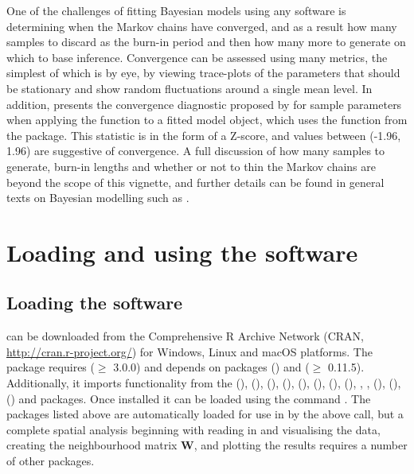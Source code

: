 \documentclass[article, nojss]{jss}
\begin{document}
\hspace{1cm} One of the challenges of fitting Bayesian models using any software is determining when the Markov chains have converged, and as a result how many samples to discard as the burn-in period and then how many more to generate on which to base inference. Convergence can be assessed using many metrics, the simplest of which is by eye, by viewing trace-plots of the parameters that should be stationary and show random fluctuations around a single mean level. In addition,  presents the convergence  diagnostic proposed by \cite{geweke1992} for sample parameters when applying the  function to a fitted model object, which uses the  function from the  package. This statistic is in the form of a Z-score, and values between (-1.96, 1.96) are suggestive of convergence. A full discussion of how many samples to generate, burn-in lengths and whether or not to thin the Markov chains are beyond the scope of this vignette, and further details can be found in general texts on Bayesian modelling such as \cite{gelman2013}.


\section{Loading and using the software}\label{section3}

\subsection{Loading the software}
 can be downloaded from the Comprehensive R Archive Network (CRAN, \url{http://cran.r-project.org/}) for Windows, Linux and macOS platforms.  The package requires  ($\geq$ 3.0.0) and depends on packages  (\citealp{mass2002}) and  ($\geq$ 0.11.5). Additionally, it imports functionality from the  (\citealp{carbayesdata}),   (\citealp{coda2006}),  (\citealp{dplyr2015}),  (\citealp{gtools}),  (\citealp{leaflet}),   (\citealp{matrixcalc2012}),  (\citealp{bivand2013}),  (\citealp{spam2010}), , ,  (\citealp{testthat}),  (\citealp{truncdist2012}),  (\citealp{truncnorm2014}) and  packages. Once installed it can be loaded using the command . The packages listed above are automatically loaded for use in  by the above call, but a complete spatial analysis beginning with reading in and visualising the data, creating the neighbourhood matrix $\mathbf{W}$, and plotting the results requires a number of other packages.
\end{document}

